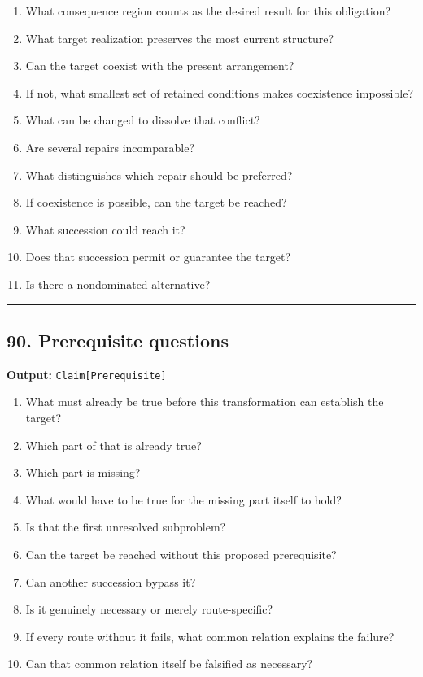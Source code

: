 \documentclass[
]{article}
\providecommand{\tightlist}{%
  \setlength{\itemsep}{0pt}\setlength{\parskip}{0pt}}
\begin{document}
\begin{enumerate}
\def\labelenumi{\arabic{enumi}.}
\tightlist
\item
  What consequence region counts as the desired result for this
  obligation?
\item
  What target realization preserves the most current structure?
\item
  Can the target coexist with the present arrangement?
\item
  If not, what smallest set of retained conditions makes coexistence
  impossible?
\item
  What can be changed to dissolve that conflict?
\item
  Are several repairs incomparable?
\item
  What distinguishes which repair should be preferred?
\item
  If coexistence is possible, can the target be reached?
\item
  What succession could reach it?
\item
  Does that succession permit or guarantee the target?
\item
  Is there a nondominated alternative?
\end{enumerate}

\begin{center}\rule{0.5\linewidth}{0.5pt}\end{center}

\subsection{90. Prerequisite questions}\label{prerequisite-questions}

\textbf{Output:} \texttt{Claim{[}Prerequisite{]}}

\begin{enumerate}
\def\labelenumi{\arabic{enumi}.}
\tightlist
\item
  What must already be true before this transformation can establish the
  target?
\item
  Which part of that is already true?
\item
  Which part is missing?
\item
  What would have to be true for the missing part itself to hold?
\item
  Is that the first unresolved subproblem?
\item
  Can the target be reached without this proposed prerequisite?
\item
  Can another succession bypass it?
\item
  Is it genuinely necessary or merely route-specific?
\item
  If every route without it fails, what common relation explains the
  failure?
\item
  Can that common relation itself be falsified as necessary?
\end{enumerate}
\end{document}
